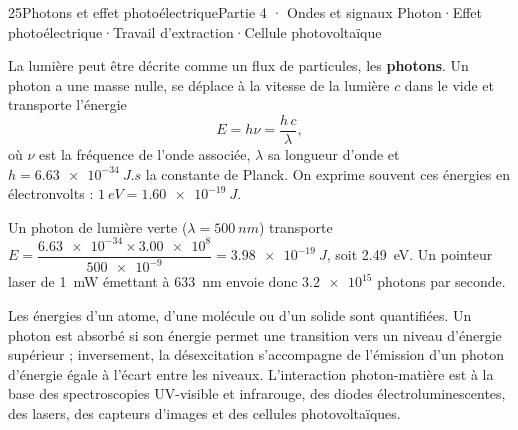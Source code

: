\begin{ouverture}[photons]{25}{Photons et effet photoélectrique}{Partie 4 · Ondes et signaux}
{Photon\enspace·\enspace Effet photoélectrique\enspace·\enspace Travail d'extraction\enspace·\enspace Cellule photovoltaïque}
\end{ouverture}
\essentiel
{}
\begin{definition}
La lumière peut être décrite comme un flux de particules, les \textbf{photons}. Un photon a une masse nulle, se déplace à la
vitesse de la lumière $c$ dans le vide et transporte l'énergie
\[E=h\nu=\frac{h\,c}{\lambda},\]
où $\nu$ est la fréquence de l'onde associée, $\lambda$ sa longueur d'onde et $h=\qty{6,63e-34}{J.s}$ la constante de Planck.
On exprime souvent ces énergies en électronvolts : $\qty{1}{eV}=\qty{1,60e-19}{J}$.
\end{definition}
\begin{exemple}
Un photon de lumière verte ($\lambda=\qty{500}{nm}$) transporte $E=\dfrac{\num{6.63e-34}\times\num{3.00e8}}{\num{500e-9}}=\qty{3,98e-19}{J}$, soit
\qty{2,49}{eV}. Un pointeur laser de \qty{1}{mW} émettant à \qty{633}{nm} envoie donc $\num{3.2e15}$ photons par seconde.
\end{exemple}
\begin{propriete}
Les énergies d'un atome, d'une molécule ou d'un solide sont quantifiées. Un photon est absorbé si son énergie permet une
transition vers un niveau d'énergie supérieur ; inversement, la désexcitation s'accompagne de l'émission d'un photon
d'énergie égale à l'écart entre les niveaux. L'interaction photon-matière est à la base des spectroscopies UV-visible et
infrarouge, des diodes électroluminescentes, des lasers, des capteurs d'images et des cellules photovoltaïques.
\end{propriete}

